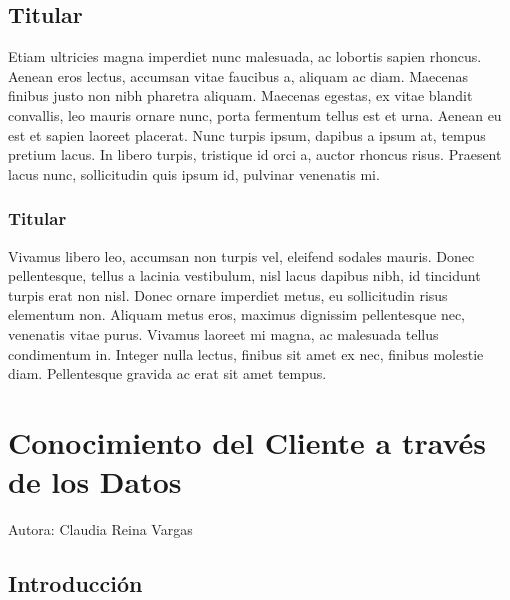 \documentclass[
  letterpaper,
  DIV=11,
  numbers=noendperiod]{scrreprt}
\begin{document}
\hypertarget{titular-10}{%
\section{Titular}\label{titular-10}}

Etiam ultricies magna imperdiet nunc malesuada, ac lobortis sapien
rhoncus. Aenean eros lectus, accumsan vitae faucibus a, aliquam ac diam.
Maecenas finibus justo non nibh pharetra aliquam. Maecenas egestas, ex
vitae blandit convallis, leo mauris ornare nunc, porta fermentum tellus
est et urna. Aenean eu est et sapien laoreet placerat. Nunc turpis
ipsum, dapibus a ipsum at, tempus pretium lacus. In libero turpis,
tristique id orci a, auctor rhoncus risus. Praesent lacus nunc,
sollicitudin quis ipsum id, pulvinar venenatis mi.

\hypertarget{titular-11}{%
\subsection{Titular}\label{titular-11}}

Vivamus libero leo, accumsan non turpis vel, eleifend sodales mauris.
Donec pellentesque, tellus a lacinia vestibulum, nisl lacus dapibus
nibh, id tincidunt turpis erat non nisl. Donec ornare imperdiet metus,
eu sollicitudin risus elementum non. Aliquam metus eros, maximus
dignissim pellentesque nec, venenatis vitae purus. Vivamus laoreet mi
magna, ac malesuada tellus condimentum in. Integer nulla lectus, finibus
sit amet ex nec, finibus molestie diam. Pellentesque gravida ac erat sit
amet tempus.


\hypertarget{conocimiento-del-cliente-a-travuxe9s-de-los-datos}{%
\chapter{Conocimiento del Cliente a través de los
Datos}\label{conocimiento-del-cliente-a-travuxe9s-de-los-datos}}

Autora: Claudia Reina Vargas

\hypertarget{introducciuxf3n-1}{%
\section{Introducción}\label{introducciuxf3n-1}}
\end{document}
